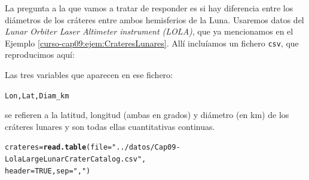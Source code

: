 \documentclass[10pt,a4paper]{article}\usepackage[]{graphicx}\usepackage[]{color}
\makeatletter
\newcommand{\hlnum}[1]{\textcolor[rgb]{0.686,0.059,0.569}{#1}}%
\newcommand{\hlstr}[1]{\textcolor[rgb]{0.192,0.494,0.8}{#1}}%
\newcommand{\hlstd}[1]{\textcolor[rgb]{0.345,0.345,0.345}{#1}}%
\newcommand{\hlkwb}[1]{\textcolor[rgb]{0.69,0.353,0.396}{#1}}%
\newcommand{\hlkwc}[1]{\textcolor[rgb]{0.333,0.667,0.333}{#1}}%
\newcommand{\hlkwd}[1]{\textcolor[rgb]{0.737,0.353,0.396}{\textbf{#1}}}%
\newenvironment{kframe}{%
 \def\at@end@of@kframe{}%
 \ifinner\ifhmode%
  \def\at@end@of@kframe{\end{minipage}}%
  \begin{minipage}{\columnwidth}%
 \fi\fi%
 \def\FrameCommand##1{\hskip\@totalleftmargin \hskip-\fboxsep
 \colorbox{shadecolor}{##1}\hskip-\fboxsep
     \hskip-\linewidth \hskip-\@totalleftmargin \hskip\columnwidth}%
 \MakeFramed {\advance\hsize-\width
   \@totalleftmargin\z@ \linewidth\hsize
   \@setminipage}}%
 {\par\unskip\endMakeFramed%
 \at@end@of@kframe}
\newenvironment{knitrout}{}{} %
\newcounter {cont01}
\makeatother
\begin{document}


La pregunta a la que vamos a tratar de responder es si hay diferencia entre los diámetros de los cráteres entre ambos hemisferios de la Luna. Usaremos datos del  {\em Lunar Orbiter Laser Altimeter instrument (LOLA)}, que ya mencionamos en el Ejemplo \ref{curso-cap09:ejem:CrateresLunares}.  Allí incluíamos un fichero {\tt csv}, que reproducimos aquí:
\begin{center}
\end{center}
Las tres variables que aparecen en ese fichero:
\begin{knitrout}
\color{fgcolor}\begin{kframe}
\begin{alltt}
Lon, Lat, Diam_km
\end{alltt}
\end{kframe}
\end{knitrout}
se refieren a la latitud, longitud (ambas en grados) y diámetro (en km) de los cráteres lunares y son todas ellas cuantitativas continuas.

\begin{knitrout}
\color{fgcolor}\begin{kframe}
\begin{alltt}
\hlstd{crateres} \hlkwb{=} \hlkwd{read.table}\hlstd{(}\hlkwc{file}\hlstd{=}\hlstr{"../datos/Cap09-LolaLargeLunarCraterCatalog.csv"}\hlstd{,}
                      \hlkwc{header}\hlstd{=}\hlnum{TRUE}\hlstd{,} \hlkwc{sep}\hlstd{=}\hlstr{","}\hlstd{)}
\end{alltt}
\end{kframe}
\end{knitrout}
\end{document}
